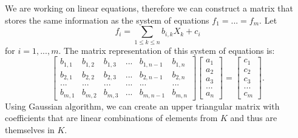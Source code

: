 \documentclass{article}
\begin{document}



We are working on linear equations, therefore we can construct a matrix that stores the same information as the system of equations $f_1=...=f_m$. Let
$$f_i=\sum\limits_{1\leq k\leq n}b_{i, k}X_k+c_i$$
for $i=1,...,m$. The matrix representation of this system of equations is:
$$\begin{bmatrix}
    b_{1,1} & b_{1, 2} & b_{1, 3} &... &b_{1, n-1} & b_{1, n}\\
    b_{2,1} & b_{2, 2} & b_{2, 3} &... &b_{2, n-1} & b_{2, n}\\
    ...     &   ...    & ...      &... & ...       & ...\\
    b_{m,1} & b_{m, 2} & b_{m, 3} &... &b_{m, n-1} & b_{m, n}
\end{bmatrix}\begin{bmatrix}
    a_1\\a_2\\a_3\\...\\a_n
\end{bmatrix}=\begin{bmatrix}
    c_1\\c_2\\c_3\\...\\c_m
\end{bmatrix}.$$
Using Gaussian algorithm, we can create an upper triangular matrix with coefficients that are linear combinations of elements from $K$ and thus are themselves in $K$.
\end{document}
